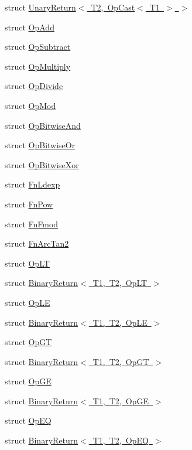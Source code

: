 \begin{DoxyCompactItemize}
\item 
struct \mbox{\hyperlink{structUnaryReturn_3_01T2_00_01OpCast_3_01T1_01_4_01_4}{Unary\+Return$<$ T2, Op\+Cast$<$ T1 $>$ $>$}}
\item 
struct \mbox{\hyperlink{structOpAdd}{Op\+Add}}
\item 
struct \mbox{\hyperlink{structOpSubtract}{Op\+Subtract}}
\item 
struct \mbox{\hyperlink{structOpMultiply}{Op\+Multiply}}
\item 
struct \mbox{\hyperlink{structOpDivide}{Op\+Divide}}
\item 
struct \mbox{\hyperlink{structOpMod}{Op\+Mod}}
\item 
struct \mbox{\hyperlink{structOpBitwiseAnd}{Op\+Bitwise\+And}}
\item 
struct \mbox{\hyperlink{structOpBitwiseOr}{Op\+Bitwise\+Or}}
\item 
struct \mbox{\hyperlink{structOpBitwiseXor}{Op\+Bitwise\+Xor}}
\item 
struct \mbox{\hyperlink{structFnLdexp}{Fn\+Ldexp}}
\item 
struct \mbox{\hyperlink{structFnPow}{Fn\+Pow}}
\item 
struct \mbox{\hyperlink{structFnFmod}{Fn\+Fmod}}
\item 
struct \mbox{\hyperlink{structFnArcTan2}{Fn\+Arc\+Tan2}}
\item 
struct \mbox{\hyperlink{structOpLT}{Op\+LT}}
\item 
struct \mbox{\hyperlink{structBinaryReturn_3_01T1_00_01T2_00_01OpLT_01_4}{Binary\+Return$<$ T1, T2, Op\+L\+T $>$}}
\item 
struct \mbox{\hyperlink{structOpLE}{Op\+LE}}
\item 
struct \mbox{\hyperlink{structBinaryReturn_3_01T1_00_01T2_00_01OpLE_01_4}{Binary\+Return$<$ T1, T2, Op\+L\+E $>$}}
\item 
struct \mbox{\hyperlink{structOpGT}{Op\+GT}}
\item 
struct \mbox{\hyperlink{structBinaryReturn_3_01T1_00_01T2_00_01OpGT_01_4}{Binary\+Return$<$ T1, T2, Op\+G\+T $>$}}
\item 
struct \mbox{\hyperlink{structOpGE}{Op\+GE}}
\item 
struct \mbox{\hyperlink{structBinaryReturn_3_01T1_00_01T2_00_01OpGE_01_4}{Binary\+Return$<$ T1, T2, Op\+G\+E $>$}}
\item 
struct \mbox{\hyperlink{structOpEQ}{Op\+EQ}}
\item 
struct \mbox{\hyperlink{structBinaryReturn_3_01T1_00_01T2_00_01OpEQ_01_4}{Binary\+Return$<$ T1, T2, Op\+E\+Q $>$}}

\end{DoxyCompactItemize}
